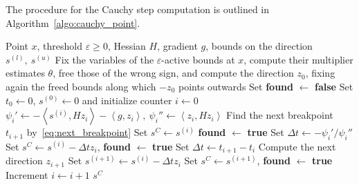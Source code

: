 \documentclass[pdflatex,sn-mathphys-num]{sn-jnl}%
\theoremstyle{thmstyleone}%
\newcommand{\inner}[2]{\left\langle {#1} , {#2} \right\rangle} %
\begin{document}
\begin{appendices}
The procedure for the Cauchy step computation is outlined in Algorithm~\ref{algo:cauchy_point}.
\begin{algorithm}
	\caption{Cauchy step computation}\label{algo:cauchy_point}
	\begin{algorithmic}[1]
		\Require Point $x$, threshold $\varepsilon \ge 0$, Hessian $H$, gradient $g$, bounds on the direction $s^{(l)},\ s^{(u)}$
		\State Fix the variables of the $\varepsilon$-active bounds at $x$, compute their multiplier estimates $\theta$, free those of the wrong sign, and compute the direction $z_0$, fixing again the freed bounds along which $-z_0$ points outwards
		\State Set \textbf{found} $\gets$ \textbf{false} 
		\State Set $t_0\gets 0$, $s^{(0)}\gets 0$ and initialize counter $i\gets 0$
		\Repeat
		\State $\psi_i' \gets -\inner{s^{(i)}}{Hz_i}-\inner{g}{z_i},\ \psi_i'' \gets \inner{z_i}{Hz_i}$
		\State Find the next breakpoint $t_{i+1}$ by~\eqref{eq:next_breakpoint}
		\State Set $s^C \gets s^{(i)}$
		\State \textbf{found} $\gets$ \textbf{true}
		\State Set $\Delta t \gets - \psi_i'/\psi_i''$
		\State Set $s^C \gets s^{(i)} - \Delta t z_i$, \textbf{found} $\gets$ \textbf{true}
		\Else
		\State Set $\Delta t \gets t_{i+1}-t_i$
		\State Compute the next direction $z_{i+1}$
		\State Set $s^{(i+1)} \gets s^{(i)} - \Delta t z_i$
		\State Set $s^C \gets s^{(i+1)}$, \textbf{found} $\gets$ \textbf{true}
		\EndIf
		\EndIf
		\State Increment $i \gets i+1$
		\State \Return $s^C$
	\end{algorithmic}
\end{algorithm}

\end{appendices}


\clearpage
\end{document}
